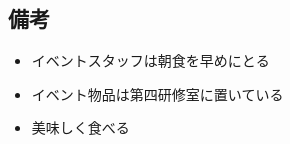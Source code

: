 \subsection{備考}
\begin{itemize}
\item イベントスタッフは朝食を早めにとる
\item イベント物品は第四研修室に置いている
\item 美味しく食べる


\end{itemize}

%

